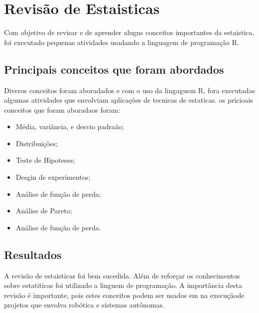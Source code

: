 \chapter{Revisão de Estaisticas}
\label{chap:stats}
Com objetivo de revisar e de aprender alugns conceitos importantes da estaistica, foi executado pequenas atividades usadando a linguagem de programação R. 

\section{Principais conceitos que foram abordados}
Diveros conceitos foram aboradados e com o uso da lingaguem R, fora executadas algumas atividades que envolviam  aplicações de tecnicas de estaticas. os pricioais conceitos que foram aboradaos foram:
\begin{itemize}
\item Média, variância, e desvio padraão;
\item Distribuições;
\item Teste de Hipoteses;
\item Desgin de experimentos;
\item Análise de função de perda;
\item Análise de Pareto;
\item Análise de função de perda.

\end{itemize}

\section{Resultados}

A revisão de estaisticas foi bem sucedida. Além de reforçar os conhecimentos sobre estatiticas foi utilizado a linguem de programação. A importância desta revisão é importante, pois estes conceitos podem ser usados em na execuçãode projetos que envolva robótica e sistemas autônomas.



 